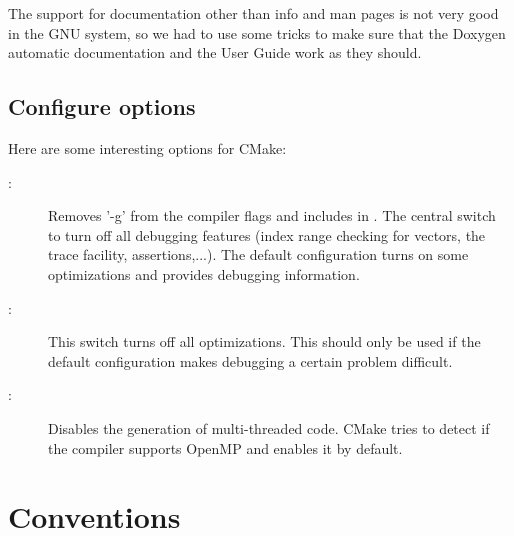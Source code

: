 The support for documentation other than info and man pages is not
very good in the GNU system, so we had to use some tricks to make sure
that the Doxygen automatic documentation and the User Guide work as they
should. 

\subsection{Configure options}

Here are some interesting options for CMake:

\begin{description}
\item[:] Removes '-g' from
the compiler flags and includes  in
. The central switch to turn off all debugging
features (index range checking for vectors, the trace facility,
assertions,...). The default configuration
turns on some optimizations and provides debugging information.

\item[:] This switch turns off all
optimizations. This should only be used if the default configuration
makes debugging a certain problem difficult.

\item[:] 
Disables the generation of multi-threaded code. CMake tries to detect if the compiler supports OpenMP and enables it by default.

\end{description}


%

\section{Conventions}
\label{sec:development:conv}

